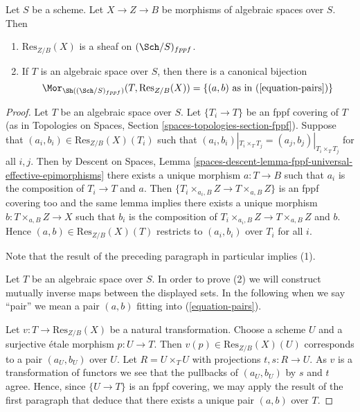 \begin{lemma}
\label{lemma-restriction-of-scalars-sheaf}
Let $S$ be a scheme. Let $X \to Z \to B$ be morphisms of
algebraic spaces over $S$. Then
\begin{enumerate}
\item $\text{Res}_{Z/B}(X)$ is a sheaf on
$(\Sch/S)_{fppf}$.
\item If $T$ is an algebraic space over $S$, then there is a
canonical bijection
$$
\Mor_{\Sh((\Sch/S)_{fppf})}(T, \text{Res}_{Z/B}(X))
=
\{(a, b)\text{ as in }(\ref{equation-pairs})\}
$$
\end{enumerate}
\end{lemma}

\begin{proof}
Let $T$ be an algebraic space over $S$. Let $\{T_i \to T\}$ be an fppf
covering of $T$ (as in
Topologies on Spaces, Section \ref{spaces-topologies-section-fppf}).
Suppose that $(a_i, b_i) \in \text{Res}_{Z/B}(X)(T_i)$ such
that $(a_i, b_i)|_{T_i \times_T T_j} = (a_j, b_j)|_{T_i \times_T T_j}$
for all $i, j$. Then by
Descent on Spaces,
Lemma \ref{spaces-descent-lemma-fppf-universal-effective-epimorphisms}
there exists a unique morphism $a : T \to B$ such that $a_i$ is the
composition of $T_i \to T$ and $a$. Then
$\{T_i \times_{a_i, B} Z \to T \times_{a, B} Z\}$ is an fppf covering
too and the same lemma implies there exists a unique morphism
$b : T \times_{a, B} Z \to X$ such that $b_i$ is the composition
of $T_i \times_{a_i, B} Z \to T \times_{a, B} Z$ and $b$. Hence
$(a, b) \in \text{Res}_{Z/B}(X)(T)$ restricts to $(a_i, b_i)$
over $T_i$ for all $i$.

\medskip\noindent
Note that the result of the preceding paragraph in particular implies (1).

\medskip\noindent
Let $T$ be an algebraic space over $S$. In order to prove (2) we will
construct mutually inverse maps between the displayed sets. In the
following when we say ``pair'' we mean a pair $(a, b)$ fitting
into (\ref{equation-pairs}).

\medskip\noindent
Let $v : T \to \text{Res}_{Z/B}(X)$ be a natural transformation.
Choose a scheme $U$ and a surjective \'etale morphism $p : U \to T$.
Then $v(p) \in \text{Res}_{Z/B}(X)(U)$ corresponds to a pair $(a_U, b_U)$
over $U$. Let $R = U \times_T U$ with projections $t, s : R \to U$.
As $v$ is a transformation of functors we see that the pullbacks of
$(a_U, b_U)$ by $s$ and $t$ agree. Hence, since $\{U \to T\}$ is an
fppf covering, we may apply the result of the first paragraph that
deduce that there exists a unique pair $(a, b)$ over $T$.


\end{proof}
